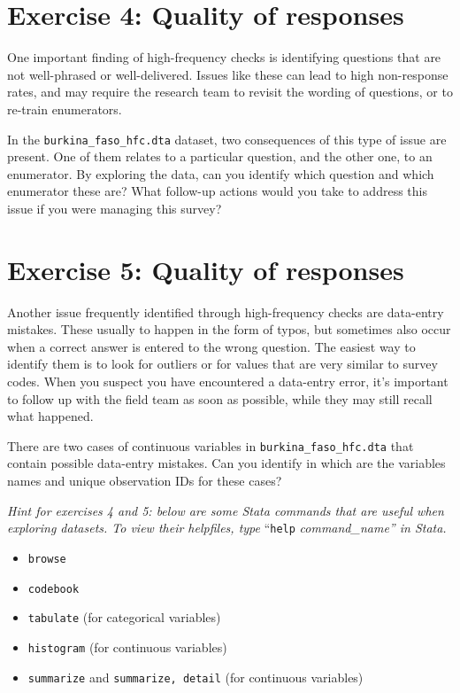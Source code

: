 \documentclass{tufte-handout}
\begin{document}
\section{Exercise 4: Quality of responses}

One important finding of high-frequency checks is identifying questions that are not well-phrased or well-delivered. Issues like these can lead to high non-response rates, and may require the research team to revisit the wording of questions, or to re-train enumerators. 

In the \texttt{burkina\_faso\_hfc.dta} dataset, two consequences of this type of issue are present. One of them relates to a particular question, and the other one, to an enumerator. By exploring the data, can you identify which question and which enumerator these are? What follow-up actions would you take to address this issue if you were managing this survey?

\section{Exercise 5: Quality of responses}

Another issue frequently identified through high-frequency checks are data-entry mistakes. These usually to happen in the form of typos, but sometimes also occur when a correct answer is entered to the wrong question. The easiest way to identify them is to look for outliers or for values that are very similar to survey codes. When you suspect you have encountered a data-entry error, it's important to follow up with the field team as soon as possible, while they may still recall what happened.

There are two cases of continuous variables in \texttt{burkina\_faso\_hfc.dta} that contain possible data-entry mistakes. Can you identify in which are the variables names and unique observation IDs for these cases?

\vspace{.5cm}
\noindent
\textit{Hint for exercises 4 and 5: below are some Stata commands that are useful when exploring datasets. To view their helpfiles, type} ``\texttt{help}\textit{ command\_name'' in Stata.}
\begin{itemize}
	\item \texttt{browse}
	\item \texttt{codebook}
	\item \texttt{tabulate} (for categorical variables)
	\item \texttt{histogram} (for continuous variables)
	\item \texttt{summarize} and \texttt{summarize, detail} (for continuous variables)
\end{itemize}
\end{document}
